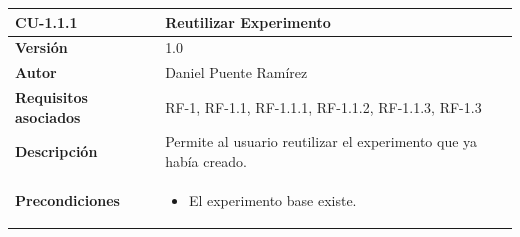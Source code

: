 \begin{longtable}[H]{@{}ll@{}}
\toprule
\begin{minipage}[b]{0.23\columnwidth}\raggedright\strut
\textbf{CU-1.1.1}\strut
\end{minipage} & \begin{minipage}[b]{0.71\columnwidth}\raggedright\strut
\textbf{Reutilizar Experimento}\strut
\end{minipage}\tabularnewline
\midrule
\endhead
\begin{minipage}[t]{0.23\columnwidth}\raggedright\strut
\textbf{Versión}\strut
\end{minipage} & \begin{minipage}[t]{0.71\columnwidth}\raggedright\strut
1.0\strut
\end{minipage}\tabularnewline
\begin{minipage}[t]{0.23\columnwidth}\raggedright\strut
\textbf{Autor}\strut
\end{minipage} & \begin{minipage}[t]{0.71\columnwidth}\raggedright\strut
Daniel Puente Ramírez\strut
\end{minipage}\tabularnewline
\begin{minipage}[t]{0.23\columnwidth}\raggedright\strut
\textbf{Requisitos asociados}\strut
\end{minipage} & \begin{minipage}[t]{0.71\columnwidth}\raggedright\strut
RF-1, RF-1.1, RF-1.1.1, RF-1.1.2, RF-1.1.3, RF-1.3\strut
\end{minipage}\tabularnewline
\begin{minipage}[t]{0.23\columnwidth}\raggedright\strut
\textbf{Descripción}\strut
\end{minipage} & \begin{minipage}[t]{0.71\columnwidth}\raggedright\strut
Permite al usuario reutilizar el experimento que ya había creado.\strut
\end{minipage}\tabularnewline
\begin{minipage}[t]{0.23\columnwidth}\raggedright\strut
\textbf{Precondiciones}\strut
\end{minipage} & \begin{minipage}[t]{0.71\columnwidth}\raggedright\strut
\begin{itemize}
\tightlist
\item El experimento base existe.
\end{itemize}\strut
\end{minipage}\tabularnewline

\end{longtable}
